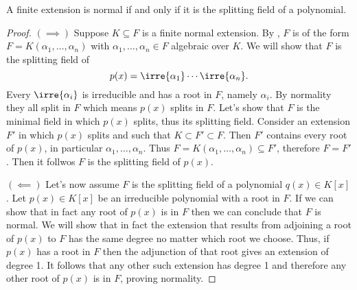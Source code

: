 \documentclass[12pt,oneside]{book}
\begin{document}
\begin{theorem}\label{theo:normal and finite iff splitting field}
	A finite extension is normal if and only if it is the splitting field of a polynomial.
\end{theorem}
\begin{proof}
	\( (\implies) \) Suppose \( K \subseteq F \) is a finite normal extension. By
	, \( F \) is of the form \( F =
	K(\alpha_1, \dots, \alpha_n) \) with \( \alpha_1, \dots, \alpha_n \in F \) algebraic
	over \( K \). We will show that \( F \) is the splitting field of
	\begin{equation*}
		p(x) = \irre{\alpha_1}\cdots\irre{\alpha_n}.
	\end{equation*}
	Every	\( \irre{\alpha_i} \) is irreducible and has a root in \( F \), namely \( \alpha_i
	\). By normality they all split in \( F \) which means \( p(x) \) splits in \( F \).
	Let's show that \( F \) is the minimal field in which \( p(x) \) splits, thus its
	splitting field. Consider an extension \( F' \) in which \( p(x) \) splits and such that
	\( K \subset F' \subset F \). Then \( F' \) contains every root of \( p(x) \), in
	particular \( \alpha_1, \dots, \alpha_n \). Thus \( F = K(\alpha_1, \dots, \alpha_n)
	\subseteq F' \), therefore \( F = F' \). Then it follwos \( F \) is the splitting field
	of \( p(x) \).

	\( (\impliedby) \) Let's now assume \( F \) is the splitting field of a polynomial \(
	q(x) \in K[x] \). Let \( p(x) \in K[x] \) be an
	irreducible polynomial with a root in \( F \). If we can show that in fact any
	root of \( p(x) \) is in \( F \) then we can conclude that \( F \) is normal. We will
	show that in fact the extension that results from adjoining a root of \( p(x) \) to \( F
	\) has the same degree no matter which root we choose. Thus, if \( p(x) \) has a root in
	\( F \) then the adjunction of that root gives an extension of degree 1. It follows that
	any other such extension has degree 1 and therefore any other root of \( p(x) \) is in
	\( F \), proving normality.


\end{proof}
\end{document}
